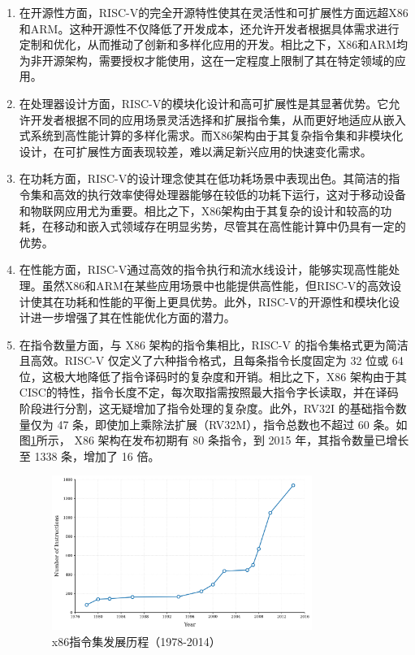 \begin{enumerate}[label={\arabic*)},itemsep=0pt, parsep=0pt]
	\item 在开源性方面，RISC-V的完全开源特性使其在灵活性和可扩展性方面远超X86和ARM。这种开源性不仅降低了开发成本，还允许开发者根据具体需求进行定制和优化，从而推动了创新和多样化应用的开发。相比之下，X86和ARM均为非开源架构，需要授权才能使用，这在一定程度上限制了其在特定领域的应用。

	\item 在处理器设计方面，RISC-V的模块化设计和高可扩展性是其显著优势。它允许开发者根据不同的应用场景灵活选择和扩展指令集，从而更好地适应从嵌入式系统到高性能计算的多样化需求。而X86架构由于其复杂指令集和非模块化设计，在可扩展性方面表现较差，难以满足新兴应用的快速变化需求。

	\item 在功耗方面，RISC-V的设计理念使其在低功耗场景中表现出色。其简洁的指令集和高效的执行效率使得处理器能够在较低的功耗下运行，这对于移动设备和物联网应用尤为重要。相比之下，X86架构由于其复杂的设计和较高的功耗，在移动和嵌入式领域存在明显劣势，尽管其在高性能计算中仍具有一定的优势。

	\item 在性能方面，RISC-V通过高效的指令执行和流水线设计，能够实现高性能处理。虽然X86和ARM在某些应用场景中也能提供高性能，但RISC-V的高效设计使其在功耗和性能的平衡上更具优势。此外，RISC-V的开源性和模块化设计进一步增强了其在性能优化方面的潜力。

	\item 在指令数量方面，与 X86 架构的指令集相比，RISC-V 的指令集格式更为简洁且高效。RISC-V 仅定义了六种指令格式，且每条指令长度固定为 32 位或 64 位，这极大地降低了指令译码时的复杂度和开销。相比之下，X86 架构由于其CISC的特性，指令长度不定，每次取指需按照最大指令字长读取，并在译码阶段进行分割，这无疑增加了指令处理的复杂度。此外，RV32I 的基础指令数量仅为 47 条，即使加上乘除法扩展（RV32M），指令总数也不超过 60 条。如图\ref{fig:x86_growth}所示， X86 架构在发布初期有 80 条指令，到 2015 年，其指令数量已增长至 1338 条，增加了 16 倍。

	      \begin{figure}[htbp]
		      \centering
		      \includegraphics[width=0.8\textwidth]{image/x86_growth.png}
		      \caption{x86指令集发展历程（1978-2014）}
		      \label{fig:x86_growth}
	      \end{figure}

\end{enumerate}

